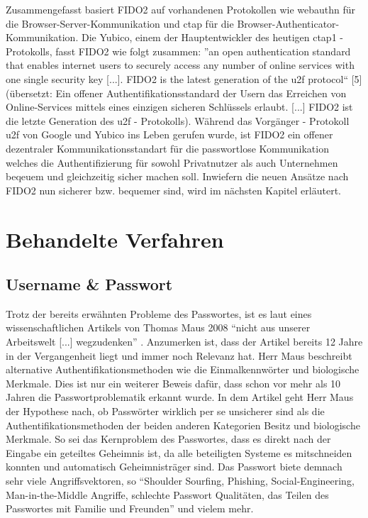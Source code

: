 Zusammengefasst basiert FIDO2 auf vorhandenen Protokollen wie \ac{webauthn} für die Browser-Server-Kommunikation und \ac{ctap} für die Browser-Authenticator-Kommunikation. Die Yubico, einem der Hauptentwickler des heutigen \ac{ctap}1 - Protokolls, fasst FIDO2 wie folgt zusammen: ''an open authentication standard that enables internet users to securely access any number of online services with one single security key [...]. FIDO2 is the latest generation of the \ac{u2f} protocol`` [5] (übersetzt: Ein offener Authentifikationsstandard der Usern das Erreichen von Online-Services mittels eines einzigen sicheren Schlüssels erlaubt. [...] FIDO2 ist die letzte Generation des \ac{u2f} - Protokolls). Während das Vorgänger - Protokoll \ac{u2f} von Google und Yubico ins Leben gerufen wurde, ist FIDO2 ein offener dezentraler Kommunikationsstandart für die passwortlose Kommunikation welches die Authentifizierung für sowohl Privatnutzer als auch Unternehmen beqeuem und gleichzeitig sicher machen soll. Inwiefern die neuen Ansätze nach FIDO2 nun sicherer bzw. bequemer sind, wird im nächsten Kapitel erläutert.
\newpage

\section{Behandelte Verfahren}
\subsection{Username \& Passwort}
Trotz der bereits erwähnten Probleme des Passwortes, ist es laut eines wissenschaftlichen Artikels von Thomas Maus 2008 ``nicht aus unserer Arbeitswelt [...] wegzudenken'' \cite{A9}. Anzumerken ist, dass der Artikel bereits 12 Jahre in der Vergangenheit liegt und immer noch Relevanz hat. Herr Maus beschreibt alternative Authentifikationsmethoden wie die Einmalkennwörter und biologische Merkmale. Dies ist nur ein weiterer Beweis dafür, dass schon vor mehr als 10 Jahren die Passwortproblematik erkannt wurde. In dem Artikel geht Herr Maus der Hypothese nach, ob Passwörter wirklich per se unsicherer sind als die Authentifikationsmethoden der beiden anderen Kategorien Besitz und biologische Merkmale. So sei das Kernproblem des Passwortes, dass es direkt nach der Eingabe ein geteiltes Geheimnis ist, da alle beteiligten Systeme es mitschneiden konnten und automatisch Geheimnisträger sind. Das Passwort biete demnach sehr viele Angriffsvektoren, so ``Shoulder Sourfing, Phishing, Social-Engineering, Man-in-the-Middle Angriffe, schlechte Passwort Qualitäten, das Teilen des Passwortes mit Familie und Freunden'' \cite{A9} und vielem mehr.

